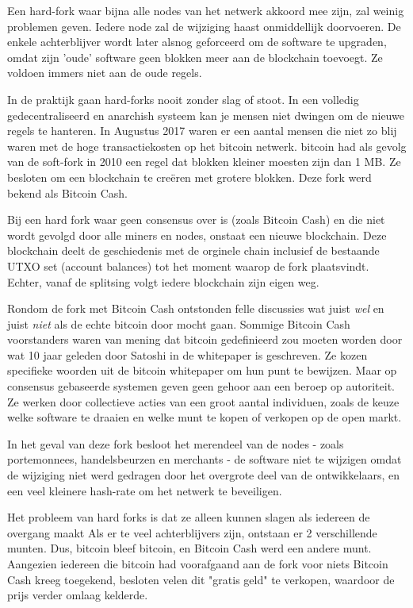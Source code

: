 \documentclass[smalldemyvopaper,11pt,twoside,onecolumn,openright,extrafontsizes]{memoir}
\begin{document}
Een hard-fork waar bijna alle nodes van het netwerk akkoord mee zijn,  zal weinig problemen geven. Iedere node zal de wijziging haast onmiddellijk doorvoeren. De enkele achterblijver wordt later alsnog geforceerd om de software te upgraden, omdat zijn 'oude' software geen blokken meer aan de blockchain toevoegt. Ze voldoen immers niet aan de oude regels.

In de praktijk gaan hard-forks nooit zonder slag of stoot. In een volledig gedecentraliseerd en anarchish systeem kan je mensen niet dwingen om de nieuwe regels te hanteren. In Augustus 2017 waren er een aantal mensen die niet zo blij waren met de hoge transactiekosten op het bitcoin netwerk. bitcoin had als gevolg van de soft-fork in 2010 een regel dat blokken kleiner moesten zijn dan 1 MB. Ze besloten om een blockchain te creëren met grotere blokken. Deze fork werd bekend als Bitcoin Cash.  

Bij een hard fork waar geen consensus over is (zoals Bitcoin Cash) en die niet wordt gevolgd door alle miners en nodes, onstaat een nieuwe blockchain. Deze blockchain deelt de geschiedenis met de orginele chain inclusief de bestaande UTXO set (account balances) tot het moment waarop de fork plaatsvindt. Echter, vanaf de splitsing volgt iedere blockchain zijn eigen weg. 

Rondom de fork met Bitcoin Cash ontstonden felle discussies wat juist \textit{wel} en juist \textit{niet} als de echte bitcoin door mocht gaan. Sommige Bitcoin Cash voorstanders waren van mening dat bitcoin gedefinieerd zou moeten worden door wat 10 jaar geleden door Satoshi in de whitepaper is geschreven. Ze kozen specifieke woorden uit de bitcoin whitepaper om hun punt te bewijzen. Maar op consensus gebaseerde systemen geven geen gehoor aan een beroep op autoriteit. Ze werken door collectieve acties van een groot aantal individuen, zoals de keuze welke software te draaien en welke munt te kopen of verkopen op de open markt.

In het geval van deze fork besloot het merendeel van de nodes - zoals portemonnees, handelsbeurzen en merchants - de software niet te wijzigen omdat de wijziging niet werd gedragen door het overgrote deel van de ontwikkelaars, en een veel kleinere hash-rate om het netwerk te beveiligen. 

Het probleem van hard forks is dat ze alleen kunnen slagen als iedereen de overgang maakt Als er te veel achterblijvers zijn, ontstaan er 2 verschillende munten. Dus, bitcoin bleef bitcoin, en Bitcoin Cash werd een andere munt. Aangezien iedereen die bitcoin had voorafgaand aan de fork voor niets Bitcoin Cash kreeg toegekend, besloten velen dit "gratis geld" te verkopen, waardoor de prijs verder omlaag kelderde.
\end{document}

